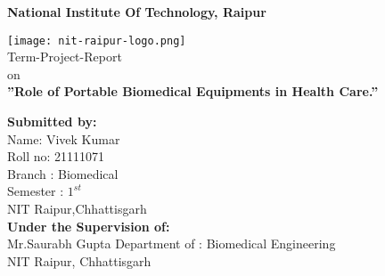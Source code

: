 \documentclass[12pt]{article}
\begin{document}
\pagestyle{empty}



   \begin{center}
       \vspace{1cm}
	   \Large
       \textbf{National Institute Of Technology, Raipur } 
       \vspace{1.5cm}
     
       \texttt{[image: nit-raipur-logo.png]}\\
       \vspace{0.8cm}
       \Huge
       Term-Project-Report\\
       \vspace{0.3cm}
       on\\
       \vspace{0.6cm}
      \textbf{ ''Role of Portable Biomedical Equipments in Health Care.''}
      
	\vfill      
      
   \begin{multicols}{2} 
   \begin{flushleft}
       \large
       \textbf{Submitted by:}\\
       Name: Vivek Kumar\\
       Roll no: 21111071\\
       Branch : Biomedical\\
       Semester : $1^{st}$ \\
       NIT Raipur,Chhattisgarh\\
       \columnbreak
       \textbf{Under the Supervision of:}\\
       Mr.Saurabh Gupta
       Department of : Biomedical Engineering\\
       NIT Raipur, Chhattisgarh
    \end{flushleft}
    \end{multicols}    
            
   \end{center}
\end{document}
